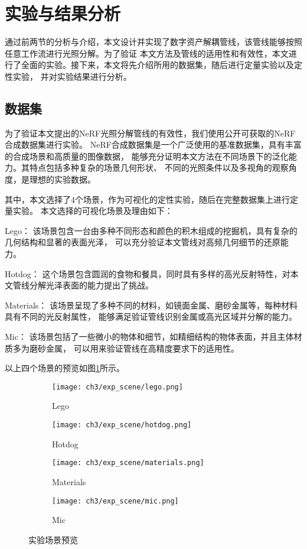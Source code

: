\section{实验与结果分析}
通过前两节的分析与介绍，本文设计并实现了数字资产解耦管线，该管线能够按照任意工作流进行光照分解。为了验证
本文方法及管线的适用性和有效性，本文进行了全面的实验。接下来，本文将先介绍所用的数据集，随后进行定量实验以及定性实验，
并对实验结果进行分析。
\subsection{数据集}

为了验证本文提出的NeRF光照分解管线的有效性，我们使用公开可获取的NeRF合成数据集进行实验。
NeRF合成数据集是一个广泛使用的基准数据集，具有丰富的合成场景和高质量的图像数据，
能够充分证明本文方法在不同场景下的泛化能力。其特点包括多种复杂的场景几何形状、
不同的光照条件以及多视角的观察角度，是理想的实验数据。

其中，本文选择了4个场景，作为可视化的定性实验，随后在完整数据集上进行定量实验。
本文选择的可视化场景及理由如下：

 Lego：
该场景包含一台由多种不同形态和颜色的积木组成的挖掘机，具有复杂的几何结构和显著的表面光泽，
可以充分验证本文管线对高频几何细节的还原能力。

 Hotdog：
这个场景包含圆润的食物和餐具，同时具有多样的高光反射特性，对本文管线分解光泽表面的能力提出了挑战。

 Materials：
该场景呈现了多种不同的材料，如镜面金属、磨砂金属等，每种材料具有不同的光反射属性，
能够满足验证管线识别金属或高光区域并分解的能力。

 Mic：
该场景包括了一些微小的物体和细节，如精细结构的物体表面，并且主体材质多为磨砂金属，
可以用来验证管线在高精度要求下的适用性。

以上四个场景的预览如图\ref{fig:exp_scene}所示。

\begin{figure}[H]
  \centering
  \begin{subfigure}[t]{0.24\textwidth}
    \centering
    \texttt{[image: ch3/exp\_scene/lego.png]}
    \caption{Lego}
  \end{subfigure}
  \begin{subfigure}[t]{0.24\textwidth}
    \centering
    \texttt{[image: ch3/exp\_scene/hotdog.png]}
    \caption{Hotdog}
  \end{subfigure}
  \begin{subfigure}[t]{0.24\textwidth}
    \centering
    \texttt{[image: ch3/exp\_scene/materials.png]}
    \caption{Materials}
  \end{subfigure}
  \begin{subfigure}[t]{0.24\textwidth}
    \centering
    \texttt{[image: ch3/exp\_scene/mic.png]}
    \caption{Mic}
  \end{subfigure}
  \caption{实验场景预览}
  \label{fig:exp_scene}
\end{figure}

